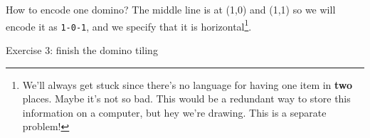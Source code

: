 \documentclass[12pt]{article}
\newcommand{\gsq}[2]{
\fill[black!60!white](#1,#2)--(#1+1,#2)--(#1+1,#2+1)--(#1,#2+1)--cycle;
 }
\newcommand{\wsq}[2]{
\fill[black!10!white](#1,#2)--(#1+1,#2)--(#1+1,#2+1)--(#1,#2+1)--cycle;
}
\begin{document}
\begin{center}
\end{center}
How to encode one domino?  The middle line is at  (1,0) and (1,1) so we will encode it as \texttt{1-0-1}, and we specify that it is horizontal\footnote{We'll always get stuck since there's no language for having one item in \textbf{two} places.  Maybe it's not so bad.  This would be a redundant way to store this information on a computer, but hey we're drawing.  This is a separate problem!}.

\newpage

\noindent Exercise 3: finish the domino tiling
\end{document}
